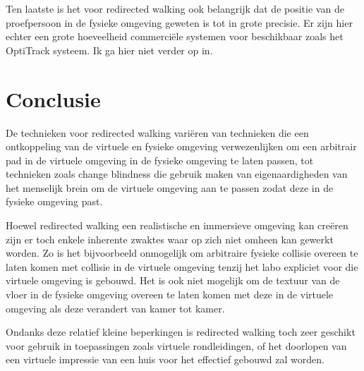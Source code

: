 Ten laatste is het voor redirected walking ook belangrijk dat de positie van
de proefpersoon in de fysieke omgeving geweten is tot in grote precisie. Er zijn
hier echter een grote hoeveelheid commerci\"ele systemen voor beschikbaar zoals
het OptiTrack systeem. Ik ga hier niet verder op in.


\section{Conclusie}
De technieken voor redirected walking vari\"eren van technieken die een
ontkoppeling van de virtuele en fysieke omgeving verwezenlijken om een arbitrair
pad in de virtuele omgeving in de fysieke omgeving te laten passen, tot
technieken zoals change blindness die gebruik maken van eigenaardigheden van het
menselijk brein om de virtuele omgeving aan te passen zodat deze in de fysieke
omgeving past.

Hoewel redirected walking een realistische en immersieve omgeving kan cre\"eren 
zijn er toch enkele inherente zwaktes waar op zich niet omheen kan gewerkt 
worden. Zo is het bijvoorbeeld onmogelijk om arbitraire fysieke collisie overeen 
te laten komen met collisie in de virtuele omgeving tenzij het labo expliciet 
voor die virtuele omgeving is gebouwd. Het is ook niet mogelijk om de textuur van
de vloer in de fysieke omgeving overeen te laten komen met deze in de virtuele
omgeving als deze verandert van kamer tot kamer.

Ondanks deze relatief kleine beperkingen is redirected walking toch zeer
geschikt voor gebruik in toepassingen zoals virtuele rondleidingen, of het
doorlopen van een virtuele impressie van een huis voor het effectief gebouwd
zal worden.
